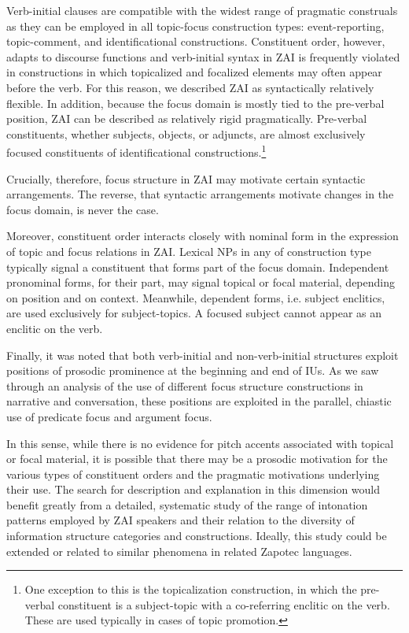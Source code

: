 Verb-initial clauses are compatible with the widest range of pragmatic construals as they can be employed in all topic-focus construction types: event-reporting, topic-comment, and identificational constructions. Constituent order, however, adapts to discourse functions and verb-initial syntax in ZAI is frequently violated in constructions in which topicalized and focalized elements may often appear before the verb. For this reason, we described ZAI as syntactically relatively flexible. In addition, because the focus domain is mostly tied to the pre-verbal position, ZAI can be described as relatively rigid pragmatically. Pre-verbal constituents, whether subjects, objects, or adjuncts, are almost exclusively focused constituents of identificational constructions.\footnote{One exception to this is the topicalization construction, in which the pre-verbal constituent is a subject-topic with a co-referring enclitic on the verb. These are used typically in cases of topic promotion.} 

Crucially, therefore, focus structure in ZAI may motivate certain syntactic arrangements. The reverse, that syntactic arrangements motivate changes in the focus domain, is never the case. 

Moreover, constituent order interacts closely with nominal form in the expression of topic and focus relations in ZAI. Lexical NPs in any of construction type typically signal a constituent that forms part of the focus domain. Independent pronominal forms, for their part, may signal topical or focal material, depending on position and on context. Meanwhile, dependent forms, i.e. subject enclitics, are used exclusively for subject-topics. A focused subject cannot appear as an enclitic on the verb. 

Finally, it was noted that both verb-initial and non-verb-initial structures exploit positions of prosodic prominence at the beginning and end of IUs. As we saw through an analysis of the use of different focus structure constructions in narrative and conversation, these positions are exploited in the parallel, chiastic use of predicate focus and argument focus. 

In this sense, while there is no evidence for pitch accents associated with topical or focal material, it is possible that there may be a prosodic motivation for the various types of constituent orders and the pragmatic motivations underlying their use. The search for description and explanation in this dimension would benefit greatly from a detailed, systematic study of the range of intonation patterns employed by ZAI speakers and their relation to the diversity of information structure categories and constructions. Ideally, this study could be extended or related to similar phenomena in related Zapotec languages.




